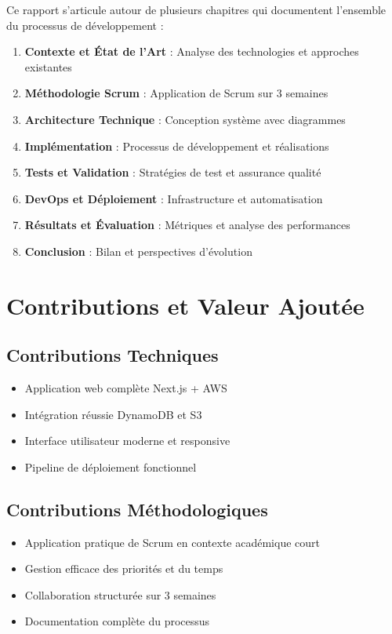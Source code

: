 Ce rapport s'articule autour de plusieurs chapitres qui documentent l'ensemble du processus de développement :

\begin{enumerate}
    \item \textbf{Contexte et État de l'Art} : Analyse des technologies et approches existantes
    \item \textbf{Méthodologie Scrum} : Application de Scrum sur 3 semaines
    \item \textbf{Architecture Technique} : Conception système avec diagrammes
    \item \textbf{Implémentation} : Processus de développement et réalisations
    \item \textbf{Tests et Validation} : Stratégies de test et assurance qualité
    \item \textbf{DevOps et Déploiement} : Infrastructure et automatisation
    \item \textbf{Résultats et Évaluation} : Métriques et analyse des performances
    \item \textbf{Conclusion} : Bilan et perspectives d'évolution
\end{enumerate}

\section{Contributions et Valeur Ajoutée}

\subsection{Contributions Techniques}
\begin{itemize}
    \item Application web complète Next.js + AWS
    \item Intégration réussie DynamoDB et S3
    \item Interface utilisateur moderne et responsive
    \item Pipeline de déploiement fonctionnel
\end{itemize}

\subsection{Contributions Méthodologiques}
\begin{itemize}
    \item Application pratique de Scrum en contexte académique court
    \item Gestion efficace des priorités et du temps
    \item Collaboration structurée sur 3 semaines
    \item Documentation complète du processus
\end{itemize}

